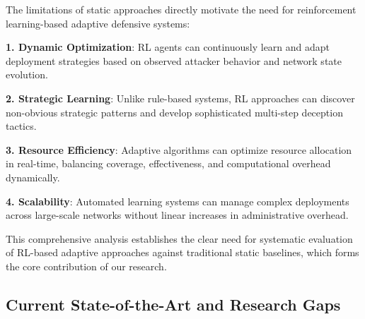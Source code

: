 \documentclass[12pt,oneside]{article}
\begin{document}
The limitations of static approaches directly motivate the need for reinforcement learning-based adaptive defensive systems:

\textbf{1. Dynamic Optimization}: RL agents can continuously learn and adapt deployment strategies based on observed attacker behavior and network state evolution.

\textbf{2. Strategic Learning}: Unlike rule-based systems, RL approaches can discover non-obvious strategic patterns and develop sophisticated multi-step deception tactics.

\textbf{3. Resource Efficiency}: Adaptive algorithms can optimize resource allocation in real-time, balancing coverage, effectiveness, and computational overhead dynamically.

\textbf{4. Scalability}: Automated learning systems can manage complex deployments across large-scale networks without linear increases in administrative overhead.

This comprehensive analysis establishes the clear need for systematic evaluation of RL-based adaptive approaches against traditional static baselines, which forms the core contribution of our research.

\subsection{Current State-of-the-Art and Research Gaps}
\end{document}
